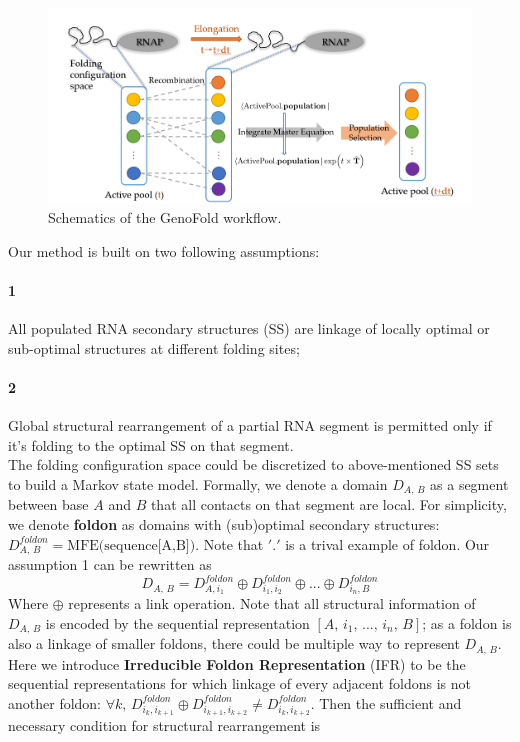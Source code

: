 \documentclass[11pt, a4paper]{article}
\begin{document}
\begin{figure}[tph]
\centering
\includegraphics[width=\textwidth]{GenoFold_schematics1.PNG}
\caption[Schematics]{\small Schematics of the GenoFold workflow.}
\label{fig:schematics1}
\end{figure}

 Our method is built on two following assumptions:
\paragraph{1} All populated RNA secondary structures (SS) are linkage of locally optimal or sub-optimal structures at different folding sites;
\paragraph{2} Global structural rearrangement of a partial RNA segment is permitted only if it's folding to the optimal SS on that segment.
\\

The folding configuration space could be discretized to above-mentioned SS sets to build a Markov state model. Formally, we denote a domain $D_{A,\,B}$ as a segment between base $A$ and $B$ that all contacts on that segment are local. For simplicity, we denote \textbf{foldon}
as domains with (sub)optimal secondary structures: $D^{foldon}_{A,\,B} = \text{MFE(sequence[A,B])}$. Note that $'.'$ is a trival example of foldon.
Our assumption 1 can be rewritten as
\begin{equation}
  D_{A,\,B} = D^{foldon}_{A, i_1} \oplus D^{foldon}_{i_1, i_2} \oplus ... \oplus D^{foldon}_{i_n, B}
\end{equation}
Where $\oplus$ represents a link operation. Note that all structural information of $D_{A,\,B}$ is encoded by the sequential representation $[A,\, i_1,\, ...,\, i_n,\, B]$;
 as a foldon is also a linkage of smaller foldons, there could be multiple way to represent $D_{A,\,B}$. Here we introduce \textbf{Irreducible Foldon Representation} (IFR) to be the
 sequential representations for which linkage of every adjacent foldons is not another foldon: $\forall k,\, D^{foldon}_{i_k, i_{k+1}} \oplus D^{foldon}_{i_{k+1}, i_{k+2}} \neq D^{foldon}_{i_{k}, i_{k+2}}$.
 Then the sufficient and necessary condition for structural rearrangement is
\end{document}
